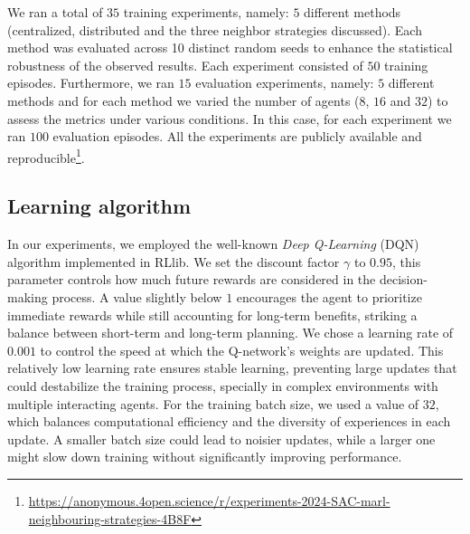 \documentclass[sigconf]{acmart}
\begin{document}
We ran a total of $35$ training experiments, 
namely: $5$ different methods %
  (centralized, distributed and the three neighbor strategies discussed).
Each method was evaluated across 10 distinct random seeds to enhance the statistical robustness of the observed results.
%
Each experiment consisted of $50$ training episodes. 
%
Furthermore, we ran $15$ evaluation experiments, namely: $5$ different methods and for each method 
  we varied the number of agents ($8$, $16$ and $32$) to assess the metrics under various conditions.
  In this case, for each experiment we ran $100$ evaluation episodes.
All the experiments are publicly available and reproducible\footnote{\url{https://anonymous.4open.science/r/experiments-2024-SAC-marl-neighbouring-strategies-4B8F}}.

\subsection{Learning algorithm}
In our experiments, we employed the well-known \emph{Deep Q-Learning} (DQN) algorithm implemented in RLlib.
%
We set the discount factor $\gamma$ to $0.95$, this parameter controls how much future rewards are 
  considered in the decision-making process.
%
A value slightly below $1$ encourages the agent to prioritize immediate rewards while still accounting 
  for long-term benefits, striking a balance between short-term and long-term planning.
%
We chose a learning rate of $0.001$ to control the speed at which the Q-network's weights are updated.
%
This relatively low learning rate ensures stable learning, preventing large updates that could destabilize 
  the training process, specially in complex environments with multiple interacting agents.
%
For the training batch size, we used a value of $32$, which balances computational efficiency and the diversity 
  of experiences in each update. 
%
A smaller batch size could lead to noisier updates, while a larger one might slow down training without
  significantly improving performance.
%
\end{document}

